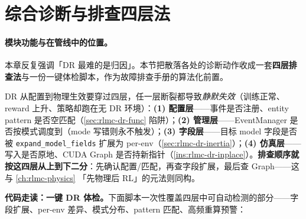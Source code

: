 \section{综合诊断与排查四层法}
\label{sec:rlmc-dr-diag}

\paragraph{模块功能与在管线中的位置。}本章反复强调「DR 最难的是归因」。本节把散落各处的诊断动作收成一套\textbf{四层排查法}与一份一键体检脚本，作为故障排查手册的算法化前置。

\begin{insight}[DR 失效的四层排查：配置-管理-字段-仿真]\label{ins:rlmc-dr-4layer}
DR 从配置到物理生效要穿过四层，任一层断裂都导致\emph{静默失效}（训练正常、reward 上升、策略却跑在无 DR 环境）：\textbf{(1) 配置层}——事件是否注册、entity pattern 是否空匹配（\cref{sec:rlmc-dr-func} 陷阱）；\textbf{(2) 管理层}——EventManager 是否按模式调度到（mode 写错则永不触发）；\textbf{(3) 字段层}——目标 model 字段是否被 \verb|expand_model_fields| 扩展为 per-env（\cref{sec:rlmc-dr-inertia}）；\textbf{(4) 仿真层}——写入是否原地、CUDA Graph 是否持新指针（\cref{ins:rlmc-dr-inplace}）。\textbf{排查顺序就按这四层从上到下二分}：先确认配置/匹配，再查字段扩展，最后查 Graph——这与 \cref{ch:rlmc-physics} 「先物理后 RL」的元法则同构。
\end{insight}

\textbf{代码走读：一键 DR 体检。}下面脚本一次性覆盖四层中可自动检测的部分——字段扩展、per-env 差异、模式分布、pattern 匹配、高频重算预警：

